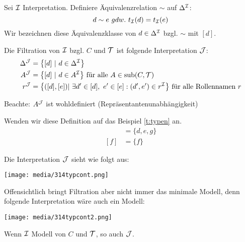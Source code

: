\begin{definition}[Filtration]

Sei $\mathcal{I}$ Interpretation. Definiere Äquivalenzrelation $\sim$ auf
$\Delta^{\mathcal{I}}$: $$d \sim e\ gdw.\ t_\MI\left( d \right) = t_\MI\left( e \right)$$
Wir bezeichnen diese Äquivalenzklasse von $d \in \Delta^{\mathcal{I}}$ bzgl. $\sim$ mit $\left\lbrack d \right\rbrack$.

Die Filtration von $\mathcal{I}$ bzgl. $C$ und $\mathcal{T}$ ist folgende Interpretation $\mathcal{J}$:
\begin{align*}
    \Delta^{\MJ} &= \left\{ \left\lbrack d \right\rbrack\ |\ d \in \Delta^\MI \right\}\\
    A^{\MJ} &= \left\{ \left\lbrack d \right\rbrack\ |\ d \in A^\MI \right\}
  \text{ für alle }A \in \sub\left( C,\MT \right)\\
  r^{\MJ} &= \left\{ \left( \left\lbrack d \right\rbrack,\left\lbrack e \right\rbrack \right)|\ \exists d' \in \left\lbrack d \right\rbrack,\ e' \in \left\lbrack e \right\rbrack:\left( d',e' \right) \in r^\MI \right\}
  \text{ für alle Rollennamen } r
\end{align*}

Beachte: $A^{\mathcal{J}}$ ist wohldefiniert (Repräsentantenunabhängigkeit)
\end{definition}

\begin{tafel} [continues=t:typen]
Wenden wir diese Definition auf das Beispiel \autoref{t:typen} an.
\begin{align*}
    [d]&=\{d,e,g\}\\
    [f]&=\{f\}
\end{align*}

Die Interpretation $\mathcal{J}$ sieht wie folgt aus:

\texttt{[image: media/314typcont.png]}

Offensichtlich bringt Filtration aber nicht immer das minimale Modell, denn folgende Interpretation wäre auch ein Modell:

\texttt{[image: media/314typcont2.png]}
\end{tafel}

\begin{theorem} 
    \label{thm:filtration}
Wenn $\mathcal{I}$ Modell von $C$ und $\mathcal{T}$, so auch $\mathcal{J}$.
\end{theorem}

